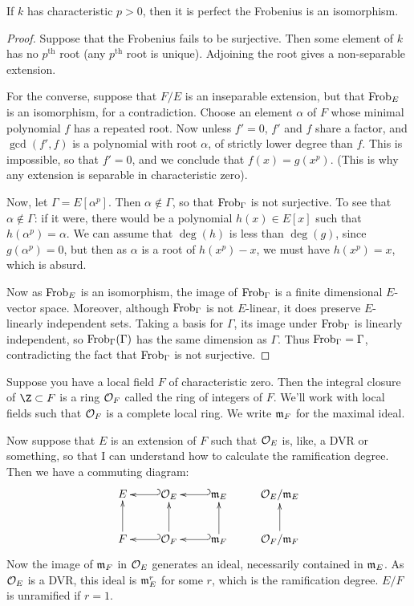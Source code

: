 \documentclass[11pt]{article}
\begin{document}
\begin{FirstTen}
\begin{fact*}If $k$ has characteristic $p>0$, then it
is perfect \Iff the Frobenius is an isomorphism.\end{fact*}
\begin{proof}
Suppose that the Frobenius fails to be surjective. Then some element of $k$ has
no $p^\text{th}$ root (any $p^\text{th}$ root is unique). Adjoining the root
gives a non-separable extension.

For the converse, suppose that $F/E$ is an inseparable extension, but that
$\operatorname{Frob}_E$ is an isomorphism, for a contradiction. Choose an element $\alpha$ of
$F$ whose minimal polynomial $f$ has a repeated root. Now unless $f'=0$, $f'$
and $f$ share a factor, and $\gcd(f',f)$ is a polynomial with root $\alpha$, of
strictly lower degree than $f$. This is impossible, so that $f'=0$, and we
conclude that $f(x)=g(x^p)$. (This is why any extension is separable in
characteristic zero).

Now, let $\Gamma=E[\alpha^p]$. Then $\alpha\notin\Gamma$, so that $\operatorname{Frob}_\Gamma$
is not surjective. To see that $\alpha\notin\Gamma$: if it were, there would be
a polynomial $h(x)\in E[x]$ such that $h(\alpha^p)=\alpha$. We can assume that
$\deg(h)$ is less than $\deg(g)$, since $g(\alpha^p)=0$, but then as $\alpha$ is
a root of $h(x^p)-x$, we must have $h(x^p)=x$, which is absurd.

Now as $\operatorname{Frob}_E$ is an isomorphism, the image of $\operatorname{Frob}_\Gamma$ is a finite
dimensional $E$-vector space. Moreover, although $\operatorname{Frob}_\Gamma$ is not
$E$-linear, it does preserve $E$-linearly independent sets. Taking a basis for
$\Gamma$, its image under $\operatorname{Frob}_\Gamma$ is linearly independent, so
$\operatorname{Frob}_\Gamma(\Gamma)$ has the same dimension as $\Gamma$. Thus
$\operatorname{Frob}_\Gamma=\Gamma$, contradicting the fact that $\operatorname{Frob}_\Gamma$ is not
surjective.
\end{proof}

Suppose you have a local field $F$ of characteristic zero. Then the integral
closure of $\Z\subset F$ is a ring $\mathcal{O}_F$ called the ring of integers of $F$.
We'll work with local fields such that $\mathcal{O}_F$ is a complete local ring.
We write $\mathfrak{m}_F$ for the maximal ideal.

Now suppose that $E$ is an extension of $F$ such that $\mathcal{O}_E$ is, like, a DVR
or something, so that I can understand how to calculate the ramification degree.
Then we have a commuting diagram:
\[\xymatrix{
E&\calO_E\ar@{_{(}->}[l]&\frakm_E\ar@{_{(}->}[l]&\calO_E/\frakm_E\\
F\ar[u]&\calO_F\ar@{_{(}->}[l]\ar[u]&\frakm_F\ar@{_{(}->}
[l]\ar[u]&\calO_F/\frakm_F\ar[u]
}\]
Now the image of $\mathfrak{m}_F$ in $\mathcal{O}_E$ generates an ideal, necessarily
contained in $\mathfrak{m}_E$. As $\mathcal{O}_E$ is a DVR, this ideal is $\mathfrak{m}_E^r$ for
some $r$, which is the ramification degree. $E/F$ is unramified if $r=1$.


\end{FirstTen}
\end{document}

